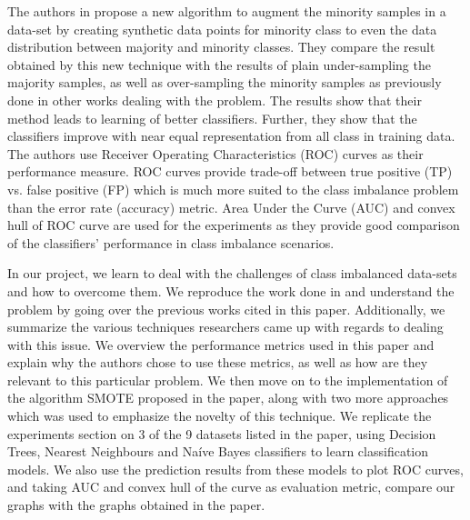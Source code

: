 \documentclass[10pt,journal,compsoc]{IEEEtran}
\begin{document}
The authors in \cite{smote} propose a new algorithm to augment the minority samples in a data-set by creating synthetic data points for minority class to even the data distribution between majority and minority classes. They compare the result obtained by this new technique with the results of plain under-sampling the majority samples, as well as over-sampling the minority samples as previously done in other works dealing with the problem.  The results show that their method leads to learning of better classifiers. Further, they show that the classifiers improve with near equal representation from all class in training data. The authors use Receiver Operating Characteristics (ROC) curves as their performance measure. ROC curves provide trade-off between true positive (TP) vs. false positive (FP) which is much more suited to the class imbalance problem than the error rate (accuracy) metric. Area Under the Curve (AUC) and convex hull of ROC curve are used for the experiments as they provide good comparison of the classifiers' performance in class imbalance scenarios. 


In our project, we learn to deal with the challenges of class imbalanced data-sets and how to overcome them. We reproduce the work done in \cite{smote} and understand the problem by going over the previous works cited in this paper. Additionally, we summarize the various techniques researchers came up with regards to dealing with this issue. We overview the performance metrics used in this paper and explain why the authors chose to use these metrics, as well as how are they relevant to this particular problem. We then move on to the implementation of the algorithm SMOTE\cite{smote} proposed in the paper, along with two more approaches which was used to emphasize the novelty of this technique. We replicate the experiments section on 3 of the 9 datasets listed in the paper, using Decision Trees, Nearest Neighbours and Naíve Bayes classifiers to learn classification models. We also use the prediction results from these models to plot ROC curves, and taking AUC and convex hull of the curve as evaluation metric, compare our graphs with the graphs obtained in the paper. 
\end{document}
